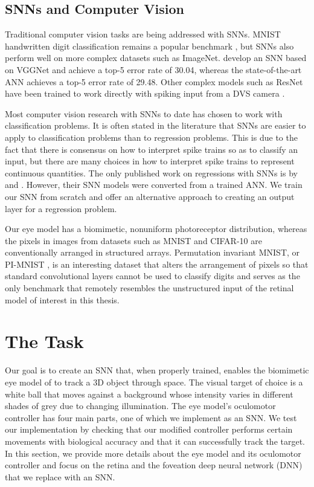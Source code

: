 \documentclass [MS] {UCLAthesis}
\begin{document}
\section{SNNs and Computer Vision}

Traditional computer vision tasks are being addressed with SNNs. MNIST handwritten digit classification remains a popular benchmark \citep{stdp}, but SNNs also perform well on more complex datasets such as ImageNet. \citet{10.3389/fnins.2019.00095} develop an SNN based on VGGNet and achieve a top-5 error rate of 30.04, whereas the state-of-the-art ANN achieves a top-5 error rate of 29.48. Other complex models such as ResNet have been trained to work directly with spiking input from a DVS camera \citep{resnet_events}.

Most computer vision research with SNNs to date has chosen to work with classification problems. It is often stated in the literature that SNNs are easier to apply to classification problems than to regression problems. This is due to the fact that there is consensus on how to interpret spike trains so as to classify an input, but there are many choices in how to interpret spike trains to represent continuous quantities. The only published work on regressions with SNNs is by \citet{regression_steering} and \citet{spiking_yolo}. However, their SNN models were converted from a trained ANN. We train our SNN from scratch and offer an alternative approach to creating an output layer for a regression problem.

Our eye model has a biomimetic, nonuniform photoreceptor distribution, whereas the pixels in images from datasets such as MNIST and CIFAR-10 are conventionally arranged in structured arrays. Permutation invariant MNIST, or PI-MNIST \citep{le2015simple}, is an interesting dataset that alters the arrangement of pixels so that standard convolutional layers cannot be used to classify digits and serves as the only benchmark that remotely resembles the unstructured input of the retinal model of interest in this thesis.


\chapter{The Task}

Our goal is to create an SNN that, when properly trained, enables the biomimetic eye model of \citet{Arjun} to track a 3D object through space. The visual target of choice is a white ball that moves against a background whose intensity varies in different shades of grey due to changing illumination. The eye model's oculomotor controller has four main parts, one of which we implement as an SNN. We test our implementation by checking that our modified controller performs certain movements with biological accuracy and that it can successfully track the target. In this section, we provide more details about the eye model and its oculomotor controller and focus on the retina and the foveation deep neural network (DNN) that we replace with an SNN.
\end{document}
